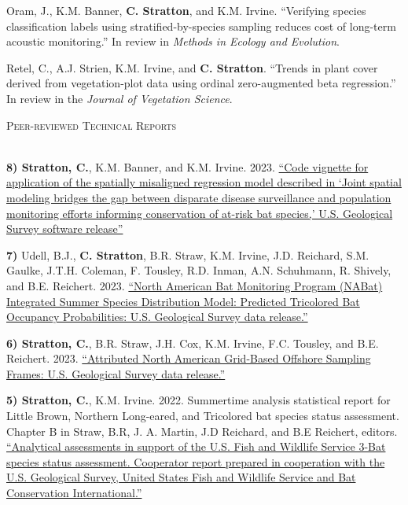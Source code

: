 \documentclass[a4paper]{article}
\newcommand{\lineunder} {
	\vspace*{-8pt} \\
	\hspace*{-18pt} \hrulefill \\
}
\newcommand{\header} [1] {
	{\hspace*{-18pt}\vspace*{6pt} \textcolor{Cerulean}{\textsc{#1}}}
	\vspace*{-6pt} \textcolor{Cerulean}{\lineunder}
}
\begin{document}
Oram, J., K.M. Banner, \textbf{C. Stratton}, and K.M. Irvine.
``Verifying species classification labels using stratified-by-species
sampling reduces cost of long-term acoustic monitoring.'' In review in
\textit{Methods in Ecology and Evolution}. \vspace*{2mm}

Retel, C., A.J. Strien, K.M. Irvine, and \textbf{C. Stratton}. ``Trends
in plant cover derived from vegetation-plot data using ordinal
zero-augmented beta regression.'' In review in the
\textit{Journal of Vegetation Science}. \vspace*{2mm}

\header{Peer-reviewed Technical Reports}
\vspace*{2mm}

\textbf{8) Stratton, C.}, K.M. Banner, and K.M. Irvine. 2023.
\href{https://code.usgs.gov/usgs/norock/irvine_k/spatial-misalignment-application}{``Code
vignette for application of the spatially misaligned regression model
described in `Joint spatial modeling bridges the gap between disparate
disease surveillance and population monitoring efforts informing
conservation of at-risk bat species,' U.S. Geological Survey software
release''} \vspace*{2mm}

\textbf{7)} Udell, B.J., \textbf{C. Stratton}, B.R. Straw, K.M. Irvine,
J.D. Reichard, S.M. Gaulke, J.T.H. Coleman, F. Tousley, R.D. Inman, A.N.
Schuhmann, R. Shively, and B.E. Reichert. 2023.
\href{https://doi.org/10.5066/P9MV37I7}{``North American Bat Monitoring
Program (NABat) Integrated Summer Species Distribution Model: Predicted
Tricolored Bat Occupancy Probabilities: U.S. Geological Survey data
release.''} \vspace*{2mm}

\textbf{6) Stratton, C.}, B.R. Straw, J.H. Cox, K.M. Irvine, F.C.
Tousley, and B.E. Reichert. 2023.
\href{https://doi.org/10.5066/P9H8NEOY}{``Attributed North American
Grid-Based Offshore Sampling Frames: U.S. Geological Survey data
release.''} \vspace*{2mm}

\textbf{5) Stratton, C.}, K.M. Irvine. 2022. Summertime analysis
statistical report for Little Brown, Northern Long-eared, and Tricolored
bat species status assessment. Chapter B in Straw, B.R, J. A. Martin,
J.D Reichard, and B.E Reichert, editors.
\href{https://doi.org/10.7944/P9B4RWEU}{``Analytical assessments in
support of the U.S. Fish and Wildlife Service 3-Bat species status
assessment. Cooperator report prepared in cooperation with the U.S.
Geological Survey, United States Fish and Wildlife Service and Bat
Conservation International.''} \vspace*{2mm}
\end{document}
